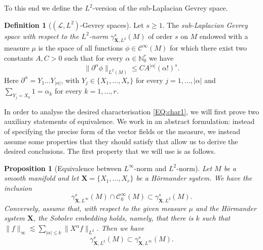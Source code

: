 \documentclass[12pt,oneside,a4paper]{book}
\numberwithin{equation}{section}     %
\theoremstyle{plain}
\newtheorem{proposition}[theorem]{Proposition}
\theoremstyle{definition}
\newtheorem{definition}[theorem]{Definition}
\newcommand{\N}{{\mathbb N}}
\newcommand{\slp}{{\mathcal L}}
\begin{document}
To this end we define the $L^2$-version of the sub-Laplacian Gevrey space.
\begin{definition}[$(\slp,L^{2})$-Gevrey spaces]\label{DEF:gslL2}
	Let $s\geq 1$. The \textit{sub-Laplacian Gevrey space with respect to the $L^2$-norm} $\gamma^s_{\mathbf{X},L^2}(M)$ of order $s$ on $M$ endowed with a measure $\mu$ is the space of all functions $\phi\in \mathcal{C}^\infty(M)$ for which there exist two constants $A,C>0$ such that for every $\alpha\in\N^r_0$ we have
	\begin{equation}\label{gevrey-L2}
	\|\partial^\alpha \phi\|_{L^2(M)}\leq C A^{|\alpha|}(\alpha!)^s.
	\end{equation}
	Here $\partial^\alpha=Y_1\dots Y_{|\alpha|}$, with $Y_j\in\{X_1,\dots,X_r\}$ for every $j=1,\dots,|\alpha|$ and $\sum_{Y_j=X_k}1=\alpha_k$ for every $k=1,\dots,r$.
\end{definition}


In order to analyse the desired characterisation \eqref{EQ:char1}, we will first prove two auxiliary statements of equivalence. We work in an abstract formulation: instead of specifying the precise form of the vector fields or the measure, we instead assume some properties that they should satisfy that allow us to derive the desired conclusions. The first property that we will use is as follows.

\begin{proposition}[Equivalence between $L^\infty$-norm and $L^2$-norm]
	\label{PROP:prop1}
	Let $M$ be a smooth manifold and let $\mathbf{X} =\{X_1,\dots,X_r\}$ be a H\"ormander system. 
	We have the inclusion
	\begin{equation}\label{EQ:inc1}
	\gamma^s_{\mathbf{X},L^{\infty}}(M)\cap \mathcal{C}_0^\infty(M)\subset \gamma^s_{\mathbf{X}, L^2}(M).
	\end{equation}
	Conversely, assume that, with respect to the given measure $\mu$ and the H\"ormander system $\mathbf{X}$, the \textit{Sobolev embedding} holds, namely, that there is $k$ such that $\|f\|_{\infty}\lesssim\sum_{|\alpha|\leq k}\|X^\alpha f\|_{L^2}$. Then we have
	\begin{equation}\label{EQ:inc2}
	\gamma^s_{\mathbf{X}, L^2}(M)\subset \gamma^s_{\mathbf{X},L^{\infty}}(M).
	\end{equation}
\end{proposition}
\end{document}

